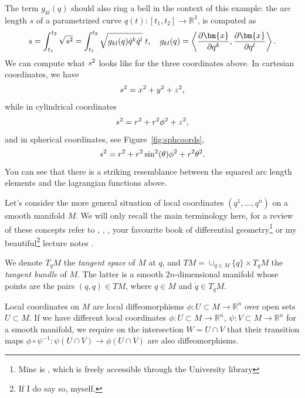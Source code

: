 \documentclass[english,fontsize=11pt,paper=a5,oneside]{scrbook}
\newcommand{\R}{\mathbb{R}}
\newcommand{\bx}{\bm{x}}
\newcommand{\lag}{\langle}
\newcommand{\rag}{\rangle}
\let\d\relax
\DeclareMathOperator{\d}{d}
\theoremstyle{definition}
\begin{document}
The term $g_{kl} (q)$ should also ring a bell in the context of this example: the arc length $s$ of a parametrized curve $q(t) : [t_1,t_2] \to \R^3$, is computed as
\begin{equation}\label{eq:arclen}
    \begin{aligned}
        s = \int_{t_1}^{t_2} \sqrt{\d s^2} = \int_{t_1}^{t_2} \sqrt{g_{kl}(q)\dot q^k \dot q^l} \;\d t,\quad
        g_{kl} (q) = \left\lag\frac{\partial\bx}{\partial q^k}, \frac{\partial \bx}{\partial q^l}\right\rag.
    \end{aligned}
\end{equation}
We can compute what $\d s^2$ looks like for the three coordinates above.
In cartesian coordinates, we have
\begin{equation}
    \d s^2 = \d x^2 + \d y^2 + \d z^2,
\end{equation}
while in cylindrical coordinates
\begin{equation}
    \d s^2 = \d r^2 + r^2 \d \phi^2 + \d z^2,
\end{equation}
and in spherical coordinates, see Figure~\ref{fig:sphcoords},
\begin{equation}\label{eq:spharc}
    \d s^2 = \d r^2 + r^2 \sin^2(\theta) \d \phi^2 + r^2 \d \theta^2.
\end{equation}
You can see that there is a striking resemblance between the squared arc length elements and the lagrangian functions above.

Let's consider the more general situation of local coordinates $(q^1, \ldots, q^n)$ on a smooth manifold $M$.
We will only recall the main terminology here, for a review of these concepts refer to \cite[Chapter 4.18]{book:arnold}, \cite[Appendix A]{book:knauf}, \cite[Chapter 4]{book:marsdenratiu}, your favourite book of differential geometry\footnote{Mine is \cite{book:lee}, which is freely accessible through the University library} or my beautiful\footnote{If I do say so, myself.} lecture notes \cite{lectures:aom:seri}.

We denote $T_q M$ the \emph{tangent space} of $M$ at $q$, and $TM = \cup_{q\in M}\{q\}\times T_q M$ the \emph{tangent bundle} of $M$. The latter is a smooth $2n$-dimensional manifold whose points are the pairs $(q,\dot q)\in TM$, where $q\in M$ and $\dot q\in T_q M$.

Local coordinates on $M$ are local diffeomorphisms $\phi:U\subset M\to \R^n$ over open sets $U\subset M$. If we have different local coordinates $\phi:U\subset M\to\R^n$, $\psi:V\subset M\to\R^n$ for a smooth manifold, we require on the intersection $W=U\cap V$ that their transition maps $\phi\circ\psi^{-1}:\psi(U\cap V)\to\phi(U\cap V)$ are also diffeomorphisms.
\end{document}
